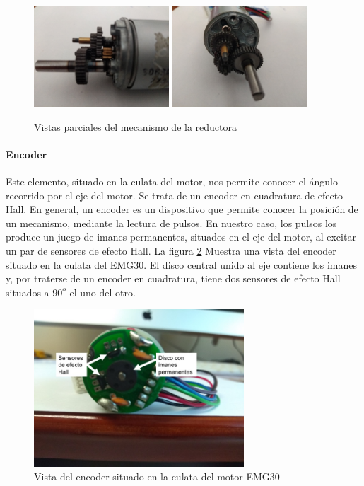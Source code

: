 \documentclass[10pt,a4paper]{report}
\begin{document}
\begin{figure}
\centering
\includegraphics[width=0.45\textwidth]{red1.jpg}
\includegraphics[width=0.45\textwidth]{red2.jpg}
\caption{Vistas parciales del mecanismo de la reductora}\label{f3}
\end{figure}

\paragraph{Encoder}
Este elemento, situado en la culata del motor, nos permite conocer el ángulo recorrido por el eje del motor. Se trata de un encoder en cuadratura de efecto Hall.
En general, un encoder es un dispositivo que permite conocer la posición de un mecanismo, mediante la lectura de pulsos. En nuestro caso, los pulsos los produce un juego de imanes permanentes, situados en el eje del motor, al excitar un par de sensores de efecto Hall.
La figura \ref{f4} Muestra una vista del  encoder situado en la culata del EMG30. El disco central unido al eje contiene los imanes y, por traterse de un encoder en cuadratura, tiene dos sensores de efecto Hall situados a $90^o$ el uno del otro.
\begin{figure}
\centering
\includegraphics[width= 0.7\textwidth]{encoder1.jpg}
\caption{Vista del encoder situado en la culata del motor EMG30}\label{f4}
\end{figure} 
\end{document}
